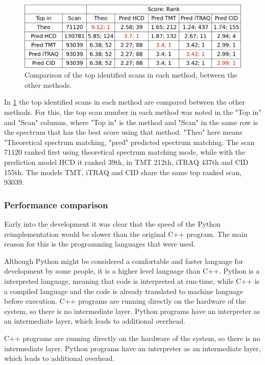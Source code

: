 \documentclass[11pt]{article}
\begin{document}
\begin{figure}[ht]
\centering
\includegraphics[width=1\textwidth]{figs/ident-comparison.png}
\caption{Comparison of the top identified scans in each method, between the other methods.}
\label{fig:ident-comparison}
\end{figure}

In \cref{fig:ident-comparison} the top identified scans in each method are compared between the other methods. For this, the top scan number in each method was noted in the "Top in" and "Scan" columns, where "Top in" is the method and "Scan" in the same row is the spectrum that has the best score using that method. "Theo" here means "Theoretical spectrum matching, "pred" predicted spectrum matching. 
The scan 71120 ranked first using theoretical spectrum matching mode, while with the prediction model HCD it ranked 39th, in TMT 212th, iTRAQ 437th and CID 155th. The models TMT, iTRAQ and CID share the same top ranked scan, 93039.

\subsubsection{Performance comparison}
Early into the development it was clear that the speed of the Python reimplementation would be slower than the original C++ program. The main reason for this is the programming languages that were used. 

Although Python might be considered a comfortable and faster language for development by some people, it is a higher level language than C++. Python is a interpreted language, meaning that code is interpreted at run-time, while C++ is a compiled language and the code is already translated to machine language before execution. C++ programs are running directly on the hardware of the system, so there is no intermediate layer. Python programs have an interpreter as an intermediate layer, which leads to additional overhead.

C++ programs are running directly on the hardware of the system, so there is no intermediate layer. Python programs have an interpreter as an intermediate layer, which leads to additional overhead.
\end{document}
